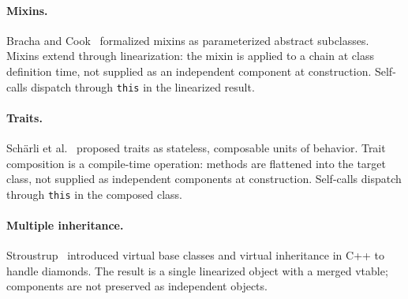 \documentclass[acmsmall,nonacm]{acmart}
\theoremstyle{acmplain}
\theoremstyle{acmdefinition}
\newcommand{\code}[1]{\texttt{#1}}
\begin{document}
\paragraph{Mixins.}
Bracha and Cook~\cite{bracha1990} formalized mixins as parameterized abstract
subclasses. Mixins extend through linearization: the mixin is applied to a chain at class
definition time, not supplied as an independent component at construction.
Self-calls dispatch through \code{this} in the linearized result.

\paragraph{Traits.}
Sch\"arli et al.~\cite{scharli2003} proposed traits as stateless, composable
units of behavior. Trait composition is a compile-time operation: methods are
flattened into the target class, not supplied as independent components at
construction. Self-calls dispatch through \code{this} in the composed class.

\paragraph{Multiple inheritance.}
Stroustrup~\cite{stroustrup1987} introduced virtual base classes and virtual
inheritance in C++ to handle diamonds. The result is a single linearized object
with a merged vtable; components are not preserved as independent objects.
\end{document}

